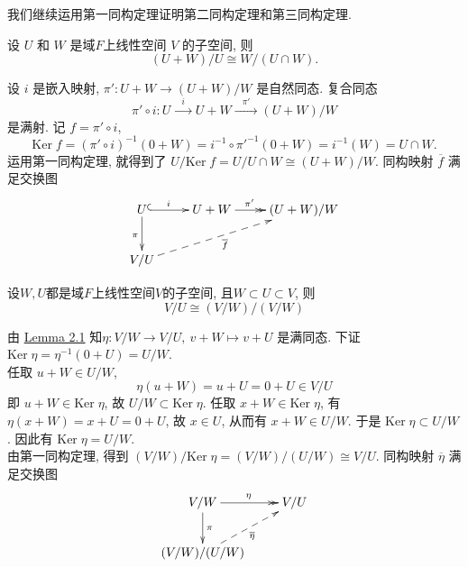 \documentclass[color=green,mathpazo,titlestyle=hang]{elegantbook}
\begin{document}
我们继续运用第一同构定理证明第二同构定理和第三同构定理.

\begin{newthem}
	
	设 $U$ 和 $W$ 是域$F$上线性空间 $V$ 的子空间, 则
	\[
	(U+W)/U\cong W/(U\cap W).
	\]
	
\end{newthem}

\begin{newproof}
	设 $i$ 是嵌入映射, $\pi':U+W\rightarrow (U+W)/W$ 是自然同态. 复合同态
	\[\pi'\circ i:U\xrightarrow{\;\;\; i\;\;\;}U+W\xrightarrow{\;\;\;\pi'\;\;\;}(U+W)/W
	\]
	是满射. 记 $f= \pi'\circ i$,
	\[
	\mathrm{Ker}\;f=(\pi'\circ i)^{-1}(0+W)= i^{-1}\circ\pi'^{-1}(0+W)=i^{-1}(W)=U\cap W.
	\]
	运用第一同构定理, 就得到了 $U/\mathrm{Ker}\;f =U/U\cap W\cong(U+W)/W$. 同构映射 $\overline{f}$ 满足交换图
	\[\xymatrix{
		U\ar[d]_{\pi}\ar@{^{(}->}[r]^{i\quad\ } & U+W\ar@{>>}[r]^{\pi'\ \quad} & (U+W)/W\\
		V/U \ar@{-->}[urr]_{\overline{f}} &  
	}\]
\end{newproof}

\begin{newthem}
	
	设$W,U$都是域$F$上线性空间$V$的子空间, 且$W\subset U\subset V$, 则
	\[
	V/U\cong (V/W)/(V/W)
	\]
	
\end{newthem}

\begin{newproof}
	由 \hyperlink{Lemma 2.1}{Lemma 2.1} 知$\eta:V/W\longrightarrow V/U,\ 
	v+W\longmapsto v+U$ 是满同态. 下证 $\mathrm{Ker}\;\eta=\eta^{-1}(0+U)=U/W$.\\
	任取 $u+W\in U/W$,
	\[
	\eta(u+W)=u+U=0+U\in V/U
	\]
	即 $u+W\in\mathrm{Ker}\;\eta$, 故 $U/W\subset\mathrm{Ker}\;\eta$.
	任取 $x+W\in \mathrm{Ker}\;\eta$, 有 $\eta(x+W)=x+U=0+U$, 故 $x\in U$, 从而有 $x+W\in U/W$. 于是 $\mathrm{Ker}\;\eta\subset U/W$. 因此有 $\mathrm{Ker}\;\eta=U/W$.\\
	由第一同构定理, 得到 $(V/W)/\mathrm{Ker}\;\eta =(V/W)/(U/W)\cong V/U$. 同构映射 $\overline{\eta}$ 满足交换图
	\[\xymatrix{
		V/W\ar@{>>}[r]^{\eta}\ar[d]^{\pi} & V/U\\
		(V/W)/(U/W) \ar@{-->}[ur]_{\overline{\eta}} 
	}\]
\end{newproof}





\end{document}
